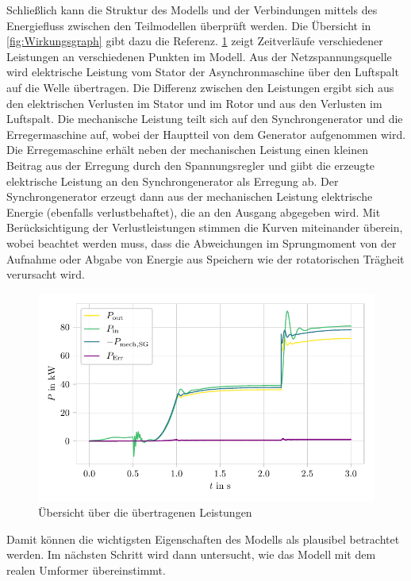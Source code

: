 Schließlich kann die Struktur des Modells und der Verbindungen mittels des Energiefluss zwischen den Teilmodellen überprüft werden. Die Übersicht in \cref{fig:Wirkungsgraph} gibt dazu die Referenz. \cref{fig:VerifikationLeistungen} zeigt Zeitverläufe verschiedener Leistungen an verschiedenen Punkten im Modell. Aus der Netzspannungsquelle wird elektrische Leistung vom Stator der Asynchronmaschine über den Luftspalt auf die Welle übertragen. Die Differenz zwischen den Leistungen ergibt sich aus den elektrischen Verlusten im Stator und im Rotor und aus den Verlusten im Luftspalt. Die mechanische Leistung teilt sich auf den Synchrongenerator und die Erregermaschine auf, wobei der Hauptteil von dem Generator aufgenommen wird. Die Erregemaschine erhält neben der mechanischen Leistung einen kleinen Beitrag aus der Erregung durch den Spannungsregler und giibt die erzeugte elektrische Leistung an den Synchrongenerator als Erregung ab. Der Synchrongenerator erzeugt dann aus der mechanischen Leistung elektrische Energie (ebenfalls verlustbehaftet), die an den Ausgang abgegeben wird. Mit Berücksichtigung der Verlustleistungen stimmen die Kurven miteinander überein, wobei beachtet werden muss, dass die Abweichungen im Sprungmoment von der Aufnahme oder Abgabe von Energie aus Speichern wie der rotatorischen Trägheit verursacht wird.
\begin{figure}
    \centering
    \includegraphics{Bilder/Verifikation_Leistung.pdf}
    \caption{Übersicht über die übertragenen Leistungen}
    \label{fig:VerifikationLeistungen}
\end{figure}

Damit können die wichtigsten Eigenschaften des Modells als plausibel betrachtet werden. Im nächsten Schritt wird dann untersucht, wie das Modell mit dem realen Umformer übereinstimmt.

